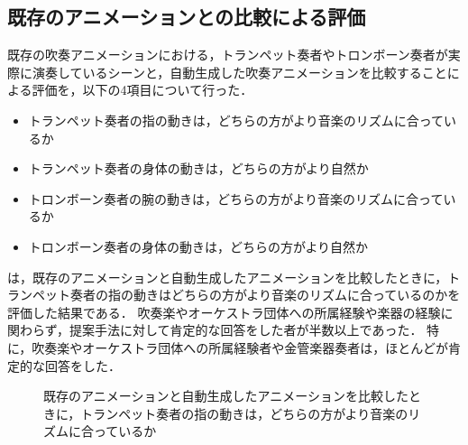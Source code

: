 \subsection{既存のアニメーションとの比較による評価}
既存の吹奏アニメーションにおける，トランペット奏者やトロンボーン奏者が実際に演奏しているシーンと，自動生成した吹奏アニメーションを比較することによる評価を，以下の4項目について行った．
\begin{itemize}
	\item トランペット奏者の指の動きは，どちらの方がより音楽のリズムに合っているか
	\item トランペット奏者の身体の動きは，どちらの方がより自然か
	\item トロンボーン奏者の腕の動きは，どちらの方がより音楽のリズムに合っているか
	\item トロンボーン奏者の身体の動きは，どちらの方がより自然か
\end{itemize}
\vspace{5mm}
\par
{}は，既存のアニメーションと自動生成したアニメーションを比較したときに，トランペット奏者の指の動きはどちらの方がより音楽のリズムに合っているのかを評価した結果である．
吹奏楽やオーケストラ団体への所属経験や楽器の経験に関わらず，提案手法に対して肯定的な回答をした者が半数以上であった．
特に，吹奏楽やオーケストラ団体への所属経験者や金管楽器奏者は，ほとんどが肯定的な回答をした．
\begin{figure}[!h]
	\centering
	\caption{既存のアニメーションと自動生成したアニメーションを比較したときに，トランペット奏者の指の動きは，どちらの方がより音楽のリズムに合っているか}
	\label{fig:Q2-1}
\end{figure}
